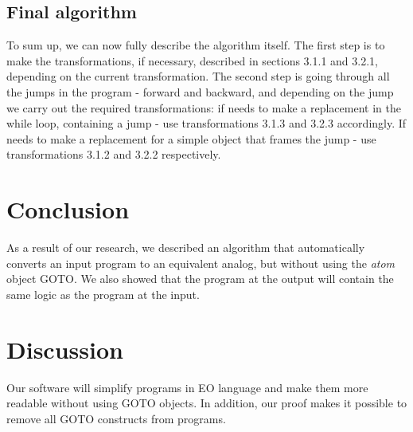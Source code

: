 \documentclass[sigplan,review,11pt,nonacm,natbib=false]{acmart}
\begin{document}
\subsection{Final algorithm}
To sum up, we can now fully describe the algorithm itself. The first step is to make the transformations, if necessary, described in sections 3.1.1 and 3.2.1, depending on the current transformation. The second step is going through all the jumps in the program - forward and backward, and depending on the jump we carry out the required transformations: if needs to make a replacement in the while loop, containing a jump - use transformations 3.1.3 and 3.2.3 accordingly. If needs to make a replacement for a simple object that frames the jump - use transformations 3.1.2 and 3.2.2 respectively.



\section{Conclusion}
As a result of our research, we described an algorithm that automatically converts an input program to an equivalent analog, but without using the \emph{atom} object GOTO. We also showed that the program at the output will contain the same logic as the program at the input.

\section{Discussion}
Our software will simplify programs in EO language and make them more readable without using GOTO objects. In addition, our proof makes it possible to remove all GOTO constructs from programs.
\end{document}
